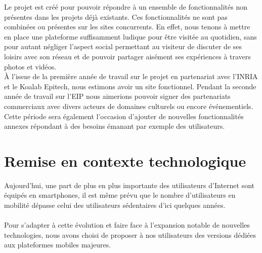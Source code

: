 \documentclass{life-fr}
\begin{document}
Le projet est créé pour pouvoir répondre à un ensemble de fonctionnalités non présentes dans les projets déjà existants. Ces fonctionnalités ne sont pas combinées ou présentes sur les sites concurrents. En effet, nous tenons à mettre en place une plateforme suffisamment ludique pour être visitée au quotidien, sans pour autant négliger l’aspect social permettant au visiteur de discuter de ses loisirs avec son réseau et de pouvoir partager aisément ses expériences à travers photos et vidéos.\\

À l'issue de la première année de travail sur le projet en partenariat avec l'INRIA et le Koalab Epitech, nous estimons avoir un site fonctionnel. Pendant la seconde année de travail sur l'EIP nous aimerions pouvoir signer des partenariats commerciaux avec divers acteurs de domaines culturels ou encore événementiels. Cette période sera également l'occasion d'ajouter de nouvelles fonctionnalités annexes répondant à des besoins émanant par exemple des utilisateurs.

\newpage

\section{Remise en contexte technologique}

Aujourd'hui, une part de plus en plus importante des utilisateurs d'Internet sont équipés en smartphones, il est même prévu que le nombre d'utilisateurs en mobilité dépasse celui des utilisateurs sédentaires d'ici quelques années.\\
\\
Pour s’adapter à cette évolution et faire face à l’expansion notable de nouvelles technologies, nous avons choisi de proposer à nos utilisateurs des versions dédiées aux plateformes mobiles majeures.
\end{document}
